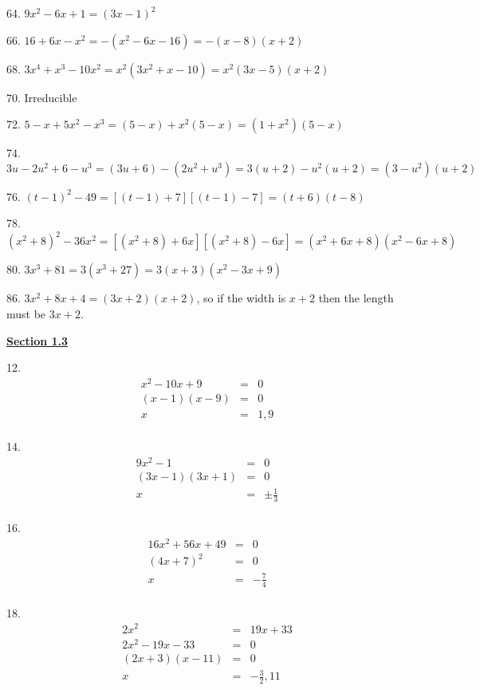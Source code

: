 \documentclass[letterpaper]{article}
\begin{document}
\bigskip

64. $9x^2-6x+1=(3x-1)^2$

\bigskip

66. $16+6x-x^2=-(x^2-6x-16)=-(x-8)(x+2)$

\bigskip

68. $3x^4+x^3-10x^2=x^2(3x^2+x-10)=x^2(3x-5)(x+2)$

\bigskip

70. Irreducible

\bigskip

72. $5-x+5x^2-x^3=(5-x)+x^2(5-x)=(1+x^2)(5-x)$

\bigskip

74. $3u-2u^2+6-u^3=(3u+6)-(2u^2+u^3)=3(u+2)-u^2(u+2)=(3-u^2)(u+2)$

\bigskip

76. $(t-1)^2-49=[(t-1)+7][(t-1)-7]=(t+6)(t-8)$

\bigskip

78. $(x^2+8)^2-36x^2=[(x^2+8)+6x][(x^2+8)-6x]=(x^2+6x+8)(x^2-6x+8)$

\bigskip

80. $3x^3+81=3(x^3+27)=3(x+3)(x^2-3x+9)$

\bigskip

86. $3x^2+8x+4=(3x+2)(x+2)$, so if the width is $x+2$ then the length must be
$3x+2$.

\bigskip

\underline{\textbf{Section 1.3}}

\bigskip

12.
\begin{eqnarray*}
x^2-10x+9 &=& 0 \\
(x-1)(x-9) &=& 0 \\
x &=& 1,9 \\
\end{eqnarray*}

14.
\begin{eqnarray*}
9x^2-1 &=& 0 \\
(3x-1)(3x+1) &=& 0 \\
x &=& \pm\frac{1}{3} \\
\end{eqnarray*}

16.
\begin{eqnarray*}
16x^2+56x+49 &=& 0 \\
(4x+7)^2 &=& 0 \\
x &=& -\frac{7}{4} \\
\end{eqnarray*}

18.
\begin{eqnarray*}
2x^2 &=& 19x+33 \\
2x^2-19x-33 &=& 0 \\
(2x+3)(x-11) &=& 0 \\
x &=& -\frac{3}{2},11 \\
\end{eqnarray*}
\end{document}
